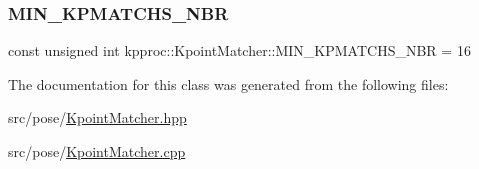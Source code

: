 \mbox{\label{classkpproc_1_1KpointMatcher_a35b716145fb33b20b3ca2bfec10e343e}} 
\subsubsection{\texorpdfstring{M\+I\+N\+\_\+\+K\+P\+M\+A\+T\+C\+H\+S\+\_\+\+N\+BR}{MIN\_KPMATCHS\_NBR}}
{\footnotesize\ttfamily const unsigned int kpproc\+::\+Kpoint\+Matcher\+::\+M\+I\+N\+\_\+\+K\+P\+M\+A\+T\+C\+H\+S\+\_\+\+N\+BR = 16\hspace{0.3cm}{\ttfamily [static]}}



The documentation for this class was generated from the following files\+:\begin{DoxyCompactItemize}
\item 
src/pose/\hyperlink{KpointMatcher_8hpp}{Kpoint\+Matcher.\+hpp}\item 
src/pose/\hyperlink{KpointMatcher_8cpp}{Kpoint\+Matcher.\+cpp}\end{DoxyCompactItemize}
